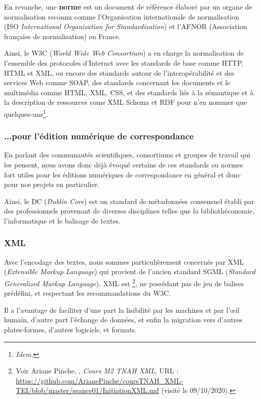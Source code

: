 En revanche, une \textbf{norme} est un document de référence élaboré par un organe de normalisation reconnu comme l’Organisation internationale de normalisation (ISO \emph{International Organization for Standardization}) et l’AFNOR (Association française de normalisation) en France.

Ainsi, le W3C (\emph{World Wide Web Consortium}) a en charge la normalisation de l'ensemble des protocoles d'Internet avec les standards de base comme HTTP, HTML et XML, ou encore des standards autour de l'interopérabilité et des services Web comme SOAP, des standards concernant les documents et le multimédia comme HTML, XML, CSS, et des standards liés à la sémantique et à la description de ressources come XML Schema et RDF pour n'en nommer que quelques-uns\footnote{\emph{Idem.}}.

\subsubsection{...pour l'édition numérique de correspondance}

En parlant des communautés scientifiques, consortiums et groupes de travail qui les pensent, nous avons donc déjà évoqué certains de ces standards ou normes fort utiles pour les éditions numériques de correspondance en général et donc pour nos projets en particulier.

Ainsi, le DC (\emph{Dublin Core}) est un standard de métadonnées consensuel établi par des professionnels provenant de diverses disciplines telles que la bibliothéconomie, l'informatique et le balisage de textes.

\subsubsection{XML}

Avec l'encodage des textes, nous sommes particulièrement concernés par XML (\emph{Extensible Markup Language}) qui provient de l'ancien standard SGML (\emph{Standard Generalized Markup Language}). XML est \footnote{Voir Ariane Pinche, , \emph{Cours M2 TNAH XML}, URL : \url{https://github.com/ArianePinche/coursTNAH_XML-TEI/blob/master/seance01/InitiationXML.md} (visité le 09/10/2020).}, ne possédant pas de jeu de balises prédéfini, et respectant les recommandations du W3C. 

Il a l'avantage de faciliter d'une part la lisibilité par les machines et par l’œil humain, d'autre part l’échange de données, et enfin la migration vers d’autres plates‐formes, d’autres logiciels, et formats.

